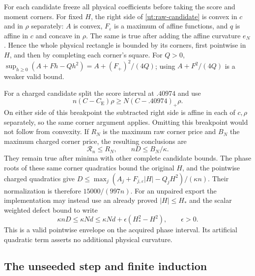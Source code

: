 \documentclass[aop,preprint]{imsart}
\theoremstyle{definition}
\newcommand{\CE}{C_{\mathrm E}}
\numberwithin{equation}{section}
\begin{document}
For each candidate freeze all physical coefficients before taking the
score and moment corners. For fixed $H$, the right side of
\eqref{ut:raw-candidate} is convex in $c$ and in $\rho$ separately:
$A$ is convex, $F_\varepsilon$ is a maximum of affine functions,
and $q$ is affine in $c$ and concave in $\rho$.
The same is true after adding the affine curvature $e_N$.
Hence the whole physical rectangle is bounded by its corners, first
pointwise in $H$, and then by completing each corner's square.
For $Q>0$, $\sup_{h\ge0}(A+Fh-Qh^2)=A+(F_+)^2/(4Q)$;
using $A+F^2/(4Q)$ is a weaker valid bound.

For a charged candidate split the score interval at $.40974$ and use
\begin{equation}\label{ut:excess-charge}
 n(C-\CE)\rho\ge N(C-.40974)_+\rho.
\end{equation}
On either side of this breakpoint the subtracted right side is
affine in each of $c,\rho$ separately, so the same corner argument
applies. Omitting this breakpoint would not follow from convexity.
If $R_N$ is the maximum raw corner price and $B_N$ the maximum
charged corner price, the resulting conclusions are
\begin{equation}\label{ut:stage-output}
 \mathcal R_n\le R_N,\qquad nD\le B_N/\kappa.
\end{equation}
They remain true after minima with other complete candidate bounds.
The phase roots of these same corner quadratics bound the original
$H$, and the pointwise charged quadratics give
$D\le\max_j(A_j+F_{j,\varepsilon}|H|-Q_jH^2)/(\kappa n)$.
Their normalization is therefore $15000/(997n)$.
For an unpaired export the implementation may instead use an already
proved $|H|\le H_*$ and the scalar weighted defect bound to write
\[
 \kappa nD\le\kappa Nd
 \le\kappa Nd+\epsilon(H_*^2-H^2),\qquad\epsilon>0.
\]
This is a valid pointwise envelope on the acquired phase interval.
Its artificial quadratic term asserts no additional physical curvature.

\subsection{The unseeded step and finite induction}
\end{document}
